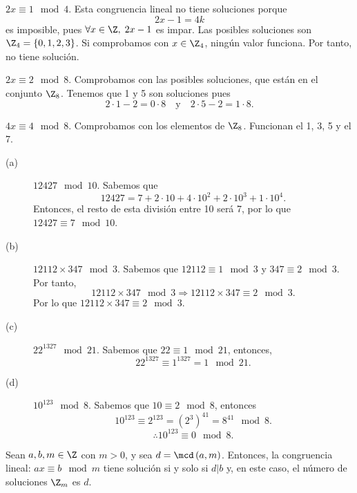\begin{eg}
\normalfont $\displaystyle 2x \equiv 1 \mod4 $. Esta congruencia lineal no tiene soluciones porque 
\[2x - 1 = 4k \]
es imposible, pues $\displaystyle \forall x \in \Z, \; 2x-1 $ es impar. Las posibles soluciones son $\displaystyle \Z_{4} = \left\{ 0,1,2,3\right\}  $. Si comprobamos con $\displaystyle x \in \Z_{4} $, ningún valor funciona. Por tanto, no tiene solución.
\end{eg}
\begin{eg}
\normalfont $\displaystyle 2x \equiv 2 \mod8 $. Comprobamos con las posibles soluciones, que están en el conjunto $\displaystyle \Z_{8} $. Tenemos que 1 y 5 son soluciones pues
\[2 \cdot 1 - 2 = 0 \cdot 8 \quad \text{y} \quad 2 \cdot 5 - 2 = 1 \cdot 8 .\]
\end{eg}
\begin{eg}
\normalfont $\displaystyle 4x \equiv 4\mod8 $. Comprobamos con los elementos de $\displaystyle \Z_{8} $. Funcionan el 1, 3, 5 y el 7. 
\end{eg}
\begin{eg}
\normalfont 
\begin{description}
\item[(a)] $\displaystyle 12427 \mod 10 $. Sabemos que 
	\[12427 = 7 + 2 \cdot 10 + 4 \cdot 10^{2} + 2 \cdot 10^{3} + 1 \cdot 10^{4} .\]
Entonces, el resto de esta división entre 10 será 7, por lo que $\displaystyle 12427  \equiv 7 \mod10 $.
\item[(b)] $\displaystyle 12112 \times 347 \mod 3 $. Sabemos que $\displaystyle 12112  \equiv 1 \mod 3 $ y $\displaystyle 347  \equiv 2 \mod 3 $. Por tanto, 
	\[ 12112 \times 347 \mod 3 \Rightarrow  12112 \times 347 \equiv 2\mod 3   .\]
Por lo que $\displaystyle 12112 \times347 \equiv 2 \mod 3 $.	
\item[(c)] $\displaystyle 22^{1327} \mod21 $. Sabemos que $\displaystyle 22 \equiv 1\mod21 $, entonces,
	\[22^{1327} \equiv 1^{1327} = 1 \mod21 .\]
\item[(d)] $\displaystyle 10^{123} \mod8 $. Sabemos que $\displaystyle 10 \equiv 2 \mod 8 $, entonces
	\[10^{123} \equiv 2^{123} = \left(2^{3}\right)^{41} = 8^{41} \mod8 .\]
\[\therefore 10^{123} \equiv 0 \mod8 .\]	
\end{description}
\end{eg}

\begin{ftheorem}[]
\normalfont Sean $\displaystyle a,b,m \in \Z $ con $\displaystyle m > 0 $, y sea $\displaystyle d = \mcd\left(a,m\right) $. Entonces, la congruencia lineal: $\displaystyle ax\equiv b \mod m $ tiene solución si y solo si $\displaystyle d | b $ y, en este caso, el número de soluciones $\displaystyle \Z_{m} $ es $\displaystyle d $. 
\end{ftheorem}

